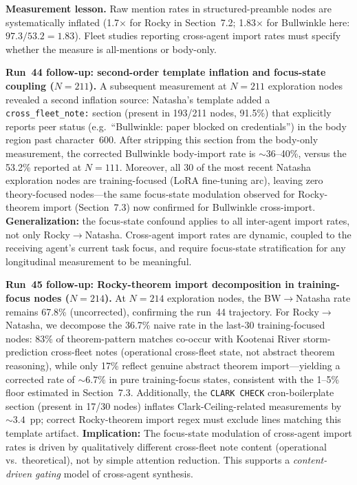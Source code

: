 \documentclass[11pt]{article}
\begin{document}
\textbf{Measurement lesson.} Raw mention rates in structured-preamble nodes are
systematically inflated (1.7$\times$ for Rocky in Section~7.2; 1.83$\times$ for Bullwinkle
here: $97.3/53.2 = 1.83$). Fleet studies reporting cross-agent import rates must specify
whether the measure is all-mentions or body-only.

\textbf{Run~44 follow-up: second-order template inflation and focus-state coupling ($N=211$).}
A subsequent measurement at $N=211$ exploration nodes revealed a second inflation source:
Natasha's template added a \texttt{cross\_fleet\_note:} section (present in 193/211 nodes,
91.5\%) that explicitly reports peer status (e.g.\ ``Bullwinkle: paper blocked on
credentials'') in the body region past character~600.
After stripping this section from the body-only measurement, the corrected
Bullwinkle body-import rate is $\sim$36--40\%, versus the 53.2\% reported at $N=111$.
Moreover, all 30 of the most recent Natasha exploration nodes are training-focused
(LoRA fine-tuning arc), leaving zero theory-focused nodes---the same focus-state
modulation observed for Rocky-theorem import (Section~7.3) now confirmed for
Bullwinkle cross-import.
\textbf{Generalization:} the focus-state confound applies to all inter-agent import
rates, not only Rocky$\to$Natasha. Cross-agent import rates are dynamic, coupled to the
receiving agent's current task focus, and require focus-state stratification for any
longitudinal measurement to be meaningful.

\textbf{Run~45 follow-up: Rocky-theorem import decomposition in training-focus nodes ($N=214$).}
At $N=214$ exploration nodes, the BW$\to$Natasha rate remains 67.8\% (uncorrected), confirming the
run~44 trajectory. For Rocky$\to$Natasha, we decompose the 36.7\% naive rate in the last-30
training-focused nodes: 83\% of theorem-pattern matches co-occur with Kootenai River
storm-prediction cross-fleet notes (operational cross-fleet state, not abstract theorem reasoning),
while only 17\% reflect genuine abstract theorem import---yielding a corrected rate of ${\sim}6.7\%$
in pure training-focus states, consistent with the 1--5\% floor estimated in Section~7.3.
Additionally, the \texttt{CLARK CHECK} cron-boilerplate section (present in 17/30 nodes) inflates
Clark-Ceiling-related measurements by ${\sim}3.4$~pp; correct Rocky-theorem import regex must
exclude lines matching this template artifact.
\textbf{Implication:} The focus-state modulation of cross-agent import rates is driven by
qualitatively different cross-fleet note content (operational vs.\ theoretical), not by
simple attention reduction. This supports a \emph{content-driven gating} model of cross-agent synthesis.
\end{document}
